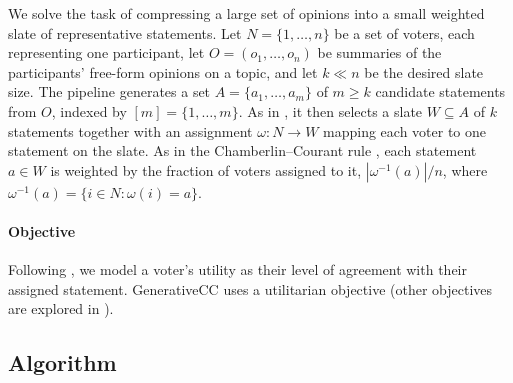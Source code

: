 \documentclass[letterpaper]{article} %
\begin{document}
We solve the task of compressing a large set of opinions into a small weighted slate of representative statements.
Let \(N=\{1,\ldots,n\}\) be a set of voters, each representing one participant, let \(O=(o_1,\ldots,o_n)\) be summaries of the participants' free-form opinions on a topic, and let \(k \ll n\) be the desired slate size.
The pipeline generates a set \(A=\{a_1,\ldots,a_m\}\) of \(m \ge k\) candidate statements from \(O\), indexed by \([m]=\{1,\ldots,m\}\).
As in \citet{fish-v2}, it then selects a slate \(W\subseteq A\) of \(k\) statements together with an assignment \(\omega:N\to W\) mapping each voter to one statement on the slate.
As in the Chamberlin--Courant rule \citep{chamberlin-courant, skowron-2015}, each statement \(a\in W\) is weighted by the fraction of voters assigned to it, \(|\omega^{-1}(a)|/n\), where \(\omega^{-1}(a)=\{i\in N:\omega(i)=a\}\).

\paragraph{Objective}
Following \citet{chamberlin-courant,fish-v2}, we model a voter's utility as their level of agreement with their assigned statement.
GenerativeCC uses a utilitarian objective (other objectives are explored in ).

\subsection{Algorithm}
\end{document}
